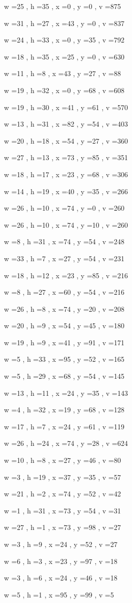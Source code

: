 \documentclass[11pt]{article}
\begin{document}
w =25 , h =35 , x =0 , y =0 , v =875
\par
w =31 , h =27 , x =43 , y =0 , v =837
\par
w =24 , h =33 , x =0 , y =35 , v =792
\par
w =18 , h =35 , x =25 , y =0 , v =630
\par
w =11 , h =8 , x =43 , y =27 , v =88
\par
w =19 , h =32 , x =0 , y =68 , v =608
\par
w =19 , h =30 , x =41 , y =61 , v =570
\par
w =13 , h =31 , x =82 , y =54 , v =403
\par
w =20 , h =18 , x =54 , y =27 , v =360
\par
w =27 , h =13 , x =73 , y =85 , v =351
\par
w =18 , h =17 , x =23 , y =68 , v =306
\par
w =14 , h =19 , x =40 , y =35 , v =266
\par
w =26 , h =10 , x =74 , y =0 , v =260
\par
w =26 , h =10 , x =74 , y =10 , v =260
\par
w =8 , h =31 , x =74 , y =54 , v =248
\par
w =33 , h =7 , x =27 , y =54 , v =231
\par
w =18 , h =12 , x =23 , y =85 , v =216
\par
w =8 , h =27 , x =60 , y =54 , v =216
\par
w =26 , h =8 , x =74 , y =20 , v =208
\par
w =20 , h =9 , x =54 , y =45 , v =180
\par
w =19 , h =9 , x =41 , y =91 , v =171
\par
w =5 , h =33 , x =95 , y =52 , v =165
\par
w =5 , h =29 , x =68 , y =54 , v =145
\par
w =13 , h =11 , x =24 , y =35 , v =143
\par
w =4 , h =32 , x =19 , y =68 , v =128
\par
w =17 , h =7 , x =24 , y =61 , v =119
\par
w =26 , h =24 , x =74 , y =28 , v =624
\par
w =10 , h =8 , x =27 , y =46 , v =80
\par
w =3 , h =19 , x =37 , y =35 , v =57
\par
w =21 , h =2 , x =74 , y =52 , v =42
\par
w =1 , h =31 , x =73 , y =54 , v =31
\par
w =27 , h =1 , x =73 , y =98 , v =27
\par
w =3 , h =9 , x =24 , y =52 , v =27
\par
w =6 , h =3 , x =23 , y =97 , v =18
\par
w =3 , h =6 , x =24 , y =46 , v =18
\par
w =5 , h =1 , x =95 , y =99 , v =5
\par
\newpage
\end{document}
